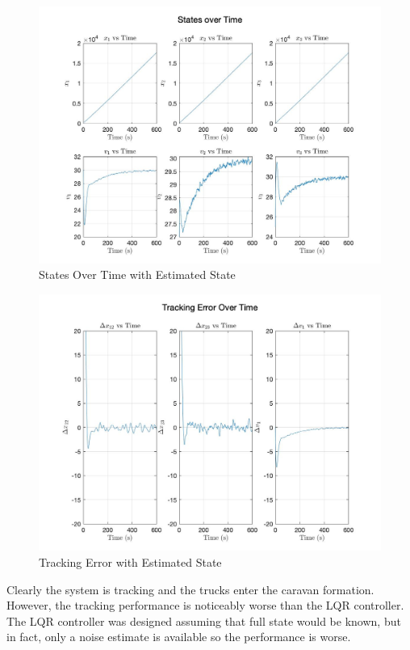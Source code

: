 \documentclass[12pt,onecolumn,reqno]{amsart}
\begin{document}
\begin{figure}[H]
	\includegraphics[width=\linewidth]{states_over_time.jpg}
	\caption{States Over Time with Estimated State}
\end{figure}

\begin{figure}[H]
	\includegraphics[width=\linewidth]{tracking_error_over_time.jpg}
	\caption{Tracking Error with Estimated State}
\end{figure}

Clearly the system is tracking and the trucks enter the caravan formation.
However, the tracking performance is noticeably worse than the LQR controller.
The LQR controller was designed assuming that full state would be known, but in
fact, only a noise estimate is available so the performance is worse. 
\end{document}
